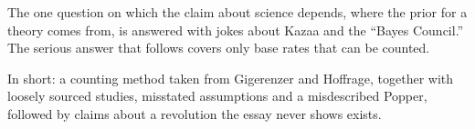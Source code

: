 \begin{afterword}
The one question on which the claim about science depends, where the prior for a theory comes from, is answered with jokes about Kazaa and the ``Bayes Council.'' The serious answer that follows covers only base rates that can be counted.

In short: a counting method taken from Gigerenzer and Hoffrage, together with loosely sourced studies, misstated assumptions and a misdescribed Popper, followed by claims about a revolution the essay never shows exists.
\end{afterword}
